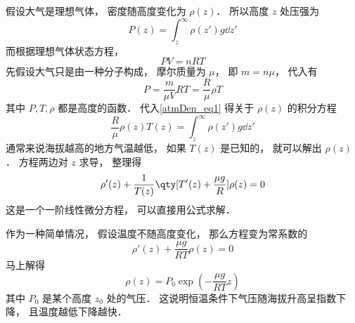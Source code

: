 

假设大气是理想气体， 密度随高度变化为 $\rho(z)$． 所以高度 $z$ 处压强为
\begin{equation}\label{atmDen_eq1}
P(z) = \int_{z}^\infty \rho(z') g \dd{z'}
\end{equation}
而根据理想气体状态方程，
\begin{equation}
PV = n R T
\end{equation}
先假设大气只是由一种分子构成， 摩尔质量为 $\mu$， 即 $m = n\mu$， 代入有
\begin{equation}
P = \frac{m}{\mu V} RT = \frac{R}{\mu} \rho T
\end{equation}
其中 $P, T, \rho$ 都是高度的函数． 代入\autoref{atmDen_eq1} 得关于 $\rho(z)$ 的积分方程
\begin{equation}
\frac{R}{\mu} \rho(z) T(z) = \int_{z}^\infty \rho(z') g \dd{z'}
\end{equation}
通常来说海拔越高的地方气温越低， 如果 $T(z)$ 是已知的， 就可以解出 $\rho(z)$． 方程两边对 $z$ 求导， 整理得
\begin{equation}
\rho'(z)  +  \frac{1}{T(z)}\qty[T'(z) + \frac{\mu g}{R}]\rho(z) = 0
\end{equation}
这是一个一阶线性微分方程， 可以直接用公式求解．

作为一种简单情况， 假设温度不随高度变化， 那么方程变为常系数的
\begin{equation}
\rho'(z)  +  \frac{\mu g}{RT}\rho(z) = 0
\end{equation}
马上解得
\begin{equation}
\rho(z) = P_0\exp(-\frac{\mu g}{RT} z)
\end{equation}
其中 $P_0$ 是某个高度 $z_0$ 处的气压． 这说明恒温条件下气压随海拔升高呈指数下降， 且温度越低下降越快．
